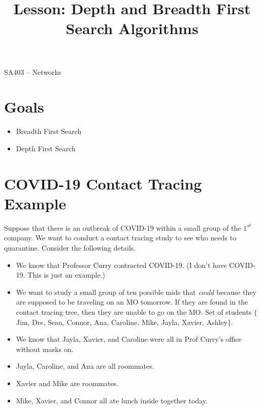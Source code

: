 \documentclass[12pt]{article}
\makeatletter
\theoremstyle{definition}
\newcommand{\graphbox}[5]%
{
\begin{tikzpicture}
     [>=latex,scale=#5]
     
     \draw [->,very thick] (#1, 0) -- (#2, 0) node[right] {$x$};
     \draw [->,very thick] (0, #3) -- (0, #4) node[above] {$y$};
     
     \draw[step=1cm,thick,dotted] (#1,#3) grid (#2,#4);
   \end{tikzpicture}
   }
\renewcommand{\maketitle}{
  \noindent SA403 -- Networks \\

  \begin{center}\Large{\textbf{\@title}}\end{center}
}
\makeatother
\begin{document}

\title{Lesson: Depth and Breadth First Search Algorithms}


\maketitle



\section*{Goals}
\begin{itemize}
\item Breadth First Search
\item Depth First Search
\end{itemize}

\section{COVID-19 Contact Tracing Example}

Suppose that there is an outbreak of COVID-19 within a small group of the $1^{st}$ company. We want to conduct a contact tracing study to see who needs to quarantine. Consider the following details.

\begin{itemize}
	\item We know that Professor Curry contracted COVID-19. (I don't have COVID-19. This is just an example.)
	\item We want to study a small group of ten possible mids that \emph{could} because they are supposed to be traveling on an MO tomorrow. If they are found in the contact tracing tree, then they are unable to go on the MO. Set of students $\{$Jim, Dre, Sean, Connor, Ana, Caroline, Mike, Jayla, Xavier, Ashley$\}$. 
	\item We know that Jayla, Xavier, and Caroline were all in Prof Curry's office without masks on.
	\item Jayla, Caroline, and Ana are all roommates.
	\item Xavier and Mike are roommates.
	\item Mike, Xavier, and Connor all ate lunch inside together today.
\end{itemize}
\newpage
\end{document}

